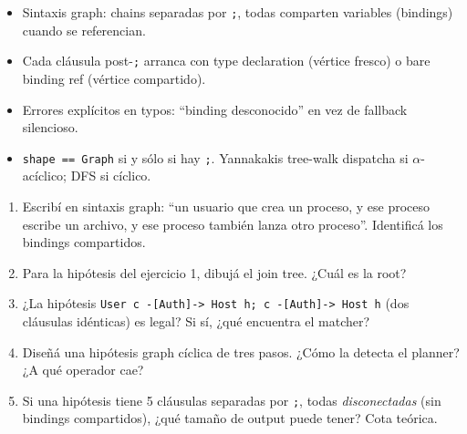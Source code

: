 \begin{itemize}
    \item Sintaxis graph: chains separadas por \texttt{;}, todas
    comparten variables (bindings) cuando se referencian.
    \item Cada cláusula post-\texttt{;} arranca con type declaration
    (vértice fresco) o bare binding ref (vértice compartido).
    \item Errores explícitos en typos: ``binding desconocido''
    en vez de fallback silencioso.
    \item \texttt{shape == Graph} si y sólo si hay \texttt{;}.
    Yannakakis tree-walk dispatcha si \(\alpha\)-acíclico; DFS si
    cíclico.
\end{itemize}

\begin{ejercicios}
\begin{enumerate}
    \item \starred{} Escribí en sintaxis graph: ``un usuario que
    crea un proceso, y ese proceso escribe un archivo, y ese
    proceso también lanza otro proceso''. Identificá los bindings
    compartidos.

    \item Para la hipótesis del ejercicio 1, dibujá el join tree.
    ¿Cuál es la root?

    \item \starred{} ¿La hipótesis
    \texttt{User c -[Auth]-> Host h; c -[Auth]-> Host h}
    (dos cláusulas idénticas) es legal? Si sí, ¿qué encuentra el
    matcher?

    \item Diseñá una hipótesis graph cíclica de tres pasos.
    ¿Cómo la detecta el planner? ¿A qué operador cae?

    \item Si una hipótesis tiene 5 cláusulas separadas por
    \texttt{;}, todas \emph{disconectadas} (sin bindings
    compartidos), ¿qué tamaño de output puede tener? Cota teórica.
\end{enumerate}
\end{ejercicios}
